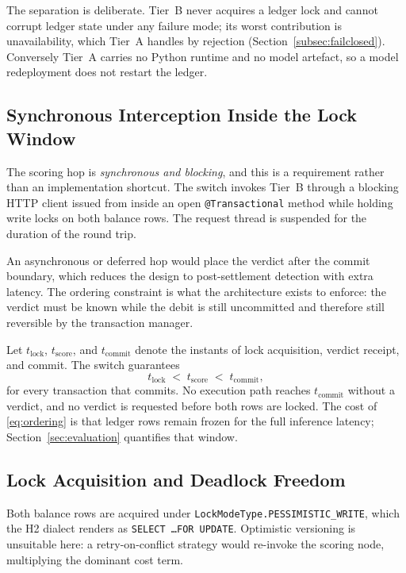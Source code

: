 \documentclass[conference]{IEEEtran}
\begin{document}
The separation is deliberate. Tier~B never acquires a ledger lock and
cannot corrupt ledger state under any failure mode; its worst
contribution is unavailability, which Tier~A handles by rejection
(Section~\ref{subsec:failclosed}). Conversely Tier~A carries no Python
runtime and no model artefact, so a model redeployment does not restart
the ledger.

\subsection{Synchronous Interception Inside the Lock Window}
\label{subsec:interception}

The scoring hop is \emph{synchronous and blocking}, and this is a
requirement rather than an implementation shortcut. The switch invokes
Tier~B through a blocking HTTP client issued from inside an open
\texttt{@Transactional} method while holding write locks on both
balance rows. The request thread is suspended for the duration of the
round trip.

An asynchronous or deferred hop would place the verdict after the
commit boundary, which reduces the design to post-settlement detection
with extra latency. The ordering constraint is what the architecture
exists to enforce: the verdict must be known while the debit is still
uncommitted and therefore still reversible by the transaction manager.

Let $t_{\mathrm{lock}}$, $t_{\mathrm{score}}$, and $t_{\mathrm{commit}}$
denote the instants of lock acquisition, verdict receipt, and commit.
The switch guarantees
\begin{equation}
t_{\mathrm{lock}} \;<\; t_{\mathrm{score}} \;<\; t_{\mathrm{commit}} ,
\label{eq:ordering}
\end{equation}
for every transaction that commits. No execution path reaches
$t_{\mathrm{commit}}$ without a verdict, and no verdict is requested
before both rows are locked. The cost of \eqref{eq:ordering} is that
ledger rows remain frozen for the full inference latency;
Section~\ref{sec:evaluation} quantifies that window.

\subsection{Lock Acquisition and Deadlock Freedom}
\label{subsec:locking}

Both balance rows are acquired under
\texttt{LockModeType.PESSIMISTIC\_WRITE}, which the H2 dialect renders
as \texttt{SELECT \ldots FOR UPDATE}. Optimistic versioning is
unsuitable here: a retry-on-conflict strategy would re-invoke the
scoring node, multiplying the dominant cost term.
\end{document}
